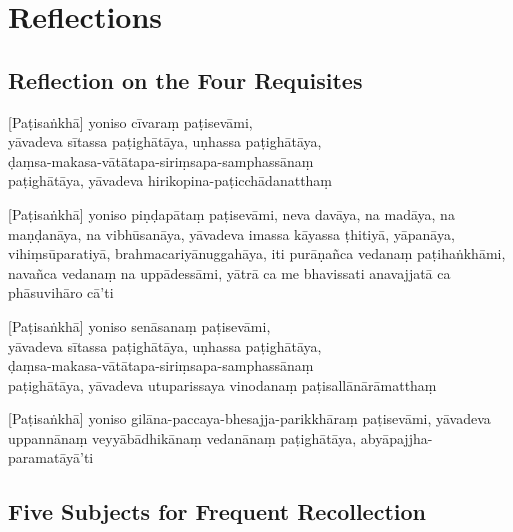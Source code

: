 \chapter{Reflections}

\section{Reflection on the Four Requisites}

\begin{leader}
\end{leader}


[Paṭisaṅkhā] yoniso cīvaraṃ paṭisevāmi,\\
yāvadeva sītassa paṭighātāya, uṇhassa paṭighātāya,\\
ḍaṃsa-makasa-vātātapa-siriṃsapa-samphassānaṃ\\
paṭighātāya, yāvadeva hirikopina-paṭicchādanatthaṃ

[Paṭisaṅkhā] yoniso piṇḍapātaṃ paṭisevāmi, neva davāya, na madāya, na maṇḍanāya,
na vibhūsanāya, yāvadeva imassa kāyassa ṭhitiyā, yāpanāya, vihiṃsūparatiyā,
brahmacariyānuggahāya, iti purāṇañca vedanaṃ paṭihaṅkhāmi, navañca vedanaṃ na
uppādessāmi, yātrā ca me bhavissati anavajjatā ca phāsuvihāro cā'ti

[Paṭisaṅkhā] yoniso senāsanaṃ paṭisevāmi,\\
yāvadeva sītassa paṭighātāya, uṇhassa paṭighātāya,\\
ḍaṃsa-makasa-vātātapa-siriṃsapa-samphassānaṃ\\
paṭighātāya, yāvadeva utuparissaya vinodanaṃ paṭisallānārāmatthaṃ

[Paṭisaṅkhā] yoniso gilāna-paccaya-bhesajja-parikkhāraṃ paṭisevāmi, yāvadeva
uppannānaṃ veyyābādhikānaṃ vedanānaṃ paṭighātāya, abyāpajjha-paramatāyā'ti\\

\vspace*{-\baselineskip}

\section{Five Subjects for Frequent Recollection}

\begin{leader}
\end{leader}

